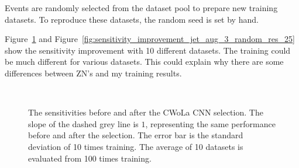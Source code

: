 \documentclass[12pt]{article}
\begin{document}
		Events are randomly selected from the dataset pool to prepare new training datasets. To reproduce these datasets, the random seed is set by hand.

		Figure~\ref{fig:sensitivity_improvement_origin_random_res_25} and Figure~\ref{fig:sensitivity_improvement_jet_aug_3_random_res_25} show the sensitivity improvement with 10 different datasets. The training could be much different for various datasets. This could explain why there are some differences between ZN's and my training results.
		\begin{figure}[htpb]
			\centering
			 \\
			\caption{The sensitivities before and after the CWoLa CNN selection. The slope of the dashed grey line is $1$, representing the same performance before and after the selection. The error bar is the standard deviation of 10 times training. The average of 10 datasets is evaluated from 100 times training.}
			\label{fig:sensitivity_improvement_origin_random_res_25}
		\end{figure}
\end{document}
